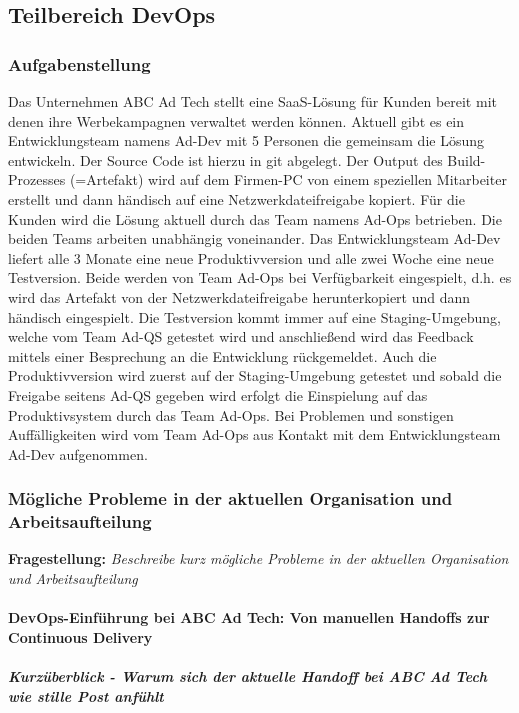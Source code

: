\subsection{Teilbereich DevOps}

\subsubsection{Aufgabenstellung}

Das Unternehmen ABC Ad Tech stellt eine SaaS-Lösung für Kunden bereit mit denen ihre
Werbekampagnen verwaltet werden können.
Aktuell gibt es ein Entwicklungsteam namens  Ad-Dev  mit 5 Personen die gemeinsam die
Lösung entwickeln. Der Source Code ist hierzu in git abgelegt. Der Output des Build-Prozesses
(=Artefakt) wird auf dem Firmen-PC von einem speziellen Mitarbeiter erstellt und dann
händisch auf eine Netzwerkdateifreigabe kopiert.
Für die Kunden wird die Lösung aktuell durch das Team namens Ad-Ops betrieben.
Die beiden Teams arbeiten unabhängig voneinander.
Das Entwicklungsteam Ad-Dev liefert alle 3 Monate eine neue Produktivversion und alle
zwei Woche eine neue Testversion. Beide werden von Team Ad-Ops bei Verfügbarkeit
eingespielt, d.h. es wird das Artefakt von der Netzwerkdateifreigabe herunterkopiert und dann
händisch eingespielt. Die Testversion kommt immer auf eine Staging-Umgebung, welche
vom Team Ad-QS getestet wird und anschließend wird das Feedback mittels einer
Besprechung an die Entwicklung rückgemeldet. Auch die Produktivversion wird zuerst auf der
Staging-Umgebung getestet und sobald die Freigabe seitens  Ad-QS  gegeben wird erfolgt die
Einspielung auf das Produktivsystem durch das Team Ad-Ops. Bei Problemen und sonstigen
Auffälligkeiten wird vom Team  Ad-Ops  aus Kontakt mit dem Entwicklungsteam  Ad-Dev 
aufgenommen.\\


\subsubsection{Mögliche Probleme in der aktuellen Organisation und Arbeitsaufteilung}

\textbf{Fragestellung:} \textit{Beschreibe kurz mögliche Probleme in der aktuellen Organisation und Arbeitsaufteilung}

\paragraph{DevOps-Einführung bei ABC Ad Tech: Von manuellen Handoffs zur Continuous Delivery}
\subparagraph{Kurzüberblick - Warum sich der aktuelle Handoff bei ABC Ad Tech wie stille Post anfühlt}


